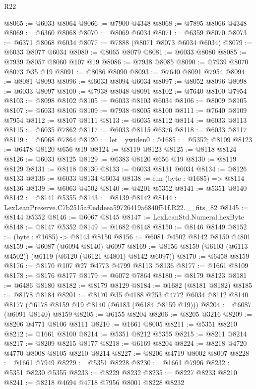 \begin{lexlean}{R22}
\begin{coremodule}
@8065 := @6033 @8064
@8066 := @7900 @4348
@8068 := @7895 @8066 @4348
@8069 := @6360 @8068
@8070 := @8069 @6034
@8071 := @6359 @8070
@8073 := @6371 @8068 @6034
@8077 := @7888 (@8071 @8073 @6034 @6034)
@8079 := @6033 @8077 @6034
@8080 := @8065 @8079
@8081 := @6033 @8080
@8085 := @7939 @8057 @8060 @107 @19
@8086 := @7938 @8085
@8090 := @7939 @8070 @8073 @35 @19
@8091 := @8086 @8090
@8093 := @7640 @8091 @7954
@8094 := @8081 @8093
@8096 := @6033 @8094 @6034
@8097 := @8052 @8096
@8098 := @6033 @8097
@8100 := @7938 @8048 @8091
@8102 := @7640 @8100 @7954
@8103 := @8098 @8102
@8105 := @6033 @8103 @6034
@8106 := @8009 @8105
@8107 := @6033 @8106
@8109 := @7938 @8005 @8100
@8111 := @7640 @8109 @7954
@8112 := @8107 @8111
@8113 := @6035 @8112
@8114 := @6033 @8113
@8115 := @6035 @7862
@8117 := @6033 @8115 @6376
@8118 := @6033 @8117
@8119 := @6068 @7864
@8120 := let _ywiden0 : @1685 := @5352; @8109
@8123 := @6478 @8120 @656 @19
@8124 := @8119 @8123
@8125 := @8118 @8124
@8126 := @6033 @8125
@8129 := @6383 @8120 @656 @19
@8130 := @8119 @8129
@8131 := @8118 @8130
@8133 := @6033 @8131 @6034
@8134 := @8126 @8133
@8136 := @6033 @8134 @6034
@8138 := fun (byte : @1685) => @8114 @8136
@8139 := @6063 @4502
@8140 := @4201 @5352
@8141 := @5351 @8140
@8142 := @8141 @5355
@8143 := @8139 @8142
@8144 := LexLeanPreserve.C7b2515af0eddeea59726419a6840f51f.R22.__fits_82
@8145 := @8144 @5352
@8146 := @6067 @8145
@8147 := LexLeanStd.Numeral.hexByte
@8148 := @8147 @5352
@8149 := @1682 @8148
@8150 := @8146 @8149
@8152 := (byte : @1685) -> @8143 @8150
@8156 := @6081 @4502 @8142 @8150 @4801
@8159 := @6087 (@6094 @8140) @6097
@8169 := @8156 @8159 (@6103 (@6113 @4502)) (@6119 (@6120 (@6121 @4801) @8142 @6097))
@8170 := @6458 @8159
@8176 := @8170 @107 @27 @4773 @4799 @8113 @8136
@8177 := @1661 @8109
@8178 := @8176 @8177
@8179 := @6072 @7864
@8180 := @8179 @8123
@8181 := @6486 @8180
@8182 := @8179 @8129
@8184 := @1682 (@8181 @8182)
@8185 := @8178 @8184
@8201 := @8170
    @35
    @4188
    @253
    @4772
    @6034
    @8112
    @8140
    @8177
    (@6178 @8159 @19 @8140 (@6183 (@6184 @8159 @19)))
@8204 := @6087 (@6091 @8140) @8159
@8205 := @6155 @8204
@8206 := @8205 @3216
@8209 := @8206 @4771 @8106 @8111
@8210 := @1661 @8005
@8211 := @5351 @8210
@8212 := @1661 @8100
@8214 := @5351 @8212 @5355
@8215 := @8211 @8214
@8217 := @8209 @8215 @8177
@8218 := @6169 @8204
@8224 := @8218 @4720 @4770 @8008 @8105 @8210 @8214
@8227 := @8206 @4719 @8002 @8007
@8228 := @1661 @7949
@8229 := @5351 @8228
@8230 := @1661 @7996
@8232 := @5351 @8230 @5355
@8233 := @8229 @8232
@8235 := @8227 @8233 @8210
@8241 := @8218 @4694 @4718 @7956 @8001 @8228 @8232

\end{coremodule}
\end{lexlean}
